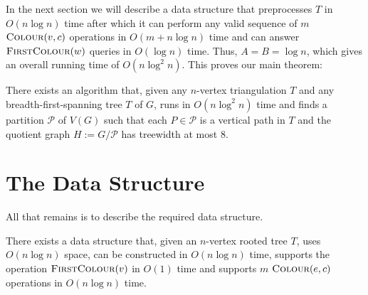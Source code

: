 \documentclass[kpfonts]{patmorin}
\begin{document}
 In the next section we will describe a data structure that preprocesses $T$ in $O(n\log n)$ time after which it can perform any valid sequence of $m$ $\textsc{Colour}(v,c)$ operations in $O(m + n\log n)$ time and can answer $\textsc{FirstColour}(w)$ queries in $O(\log n)$ time.  Thus, $A=B=\log n$, which gives an overall running time of $O(n\log^2 n)$.  This proves our main theorem:
 
\begin{thm}
  There exists an algorithm that, given any $n$-vertex triangulation $T$ and any breadth-first-spanning tree $T$ of $G$, runs in $O(n\log^2 n)$ time and finds a partition $\mathcal{P}$ of $V(G)$ such that each $P\in\mathcal{P}$ is a vertical path in $T$ and the quotient graph $H:=G/\mathcal{P}$ has treewidth at most $8$.
\end{thm}

 
\section{The Data Structure}

All that remains is to describe the required data structure.

 \begin{lem}
   There exists a data structure that, given an $n$-vertex rooted tree $T$, uses $O(n\log n)$ space, can be constructed in $O(n\log n)$ time, supports the operation $\textsc{FirstColour}(v)$ in $O(1)$ time and supports $m$ $\textsc{Colour}(e,c)$ operations in $O(n\log n)$ time.
 \end{lem}
\end{document}
